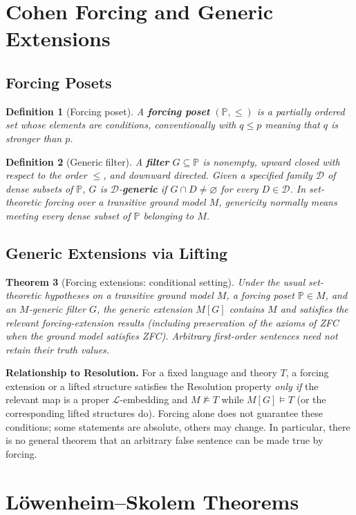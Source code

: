 \documentclass[11pt]{article}
\newtheorem{definition}{Definition}
\newtheorem{theorem}[definition]{Theorem}
\newcommand{\Sat}{\models}
\newcommand{\NSat}{\not\models}
\begin{document}
\section{Cohen Forcing and Generic Extensions}
\subsection{Forcing Posets}
\begin{definition}[Forcing poset]
A \textbf{forcing poset} $(\mathbb P,\leq)$ is a partially ordered set whose elements are conditions, conventionally with $q\leq p$ meaning that $q$ is stronger than $p$.
\end{definition}
\begin{definition}[Generic filter]
A \textbf{filter} $G\subseteq\mathbb P$ is nonempty, upward closed with respect to the order $\leq$, and downward directed. Given a specified family $\mathcal D$ of dense subsets of $\mathbb P$, $G$ is $\mathcal D$-\textbf{generic} if $G\cap D\ne\varnothing$ for every $D\in\mathcal D$. In set-theoretic forcing over a transitive ground model $M$, genericity normally means meeting every dense subset of $\mathbb P$ belonging to $M$.
\end{definition}
\subsection{Generic Extensions via Lifting}
\begin{theorem}[Forcing extensions: conditional setting]
Under the usual set-theoretic hypotheses on a transitive ground model $M$, a forcing poset $\mathbb P\in M$, and an $M$-generic filter $G$, the generic extension $M[G]$ contains $M$ and satisfies the relevant forcing-extension results (including preservation of the axioms of ZFC when the ground model satisfies ZFC). Arbitrary first-order sentences need not retain their truth values.
\end{theorem}
\noindent\textbf{Relationship to Resolution.} For a fixed language and theory $T$, a forcing extension or a lifted structure satisfies the Resolution property \emph{only if} the relevant map is a proper $\mathcal L$-embedding and $M\NSat T$ while $M[G]\Sat T$ (or the corresponding lifted structures do). Forcing alone does not guarantee these conditions; some statements are absolute, others may change. In particular, there is no general theorem that an arbitrary false sentence can be made true by forcing.

\section{L\"owenheim--Skolem Theorems}
\end{document}
